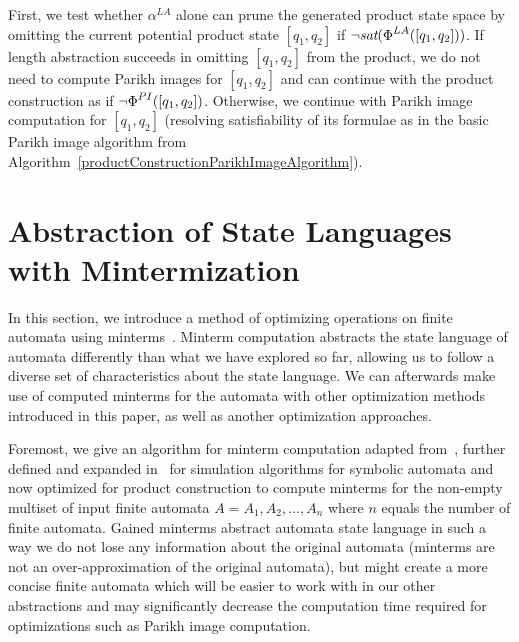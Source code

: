 First, we test whether $\alpha^{LA}$ alone can prune the generated product state space by omitting the current potential product state $[q_1, q_2]$ if $\neg \emph{sat}(\emph{$\Phi$}^{LA}([q_1, q_2]))$. If length abstraction succeeds in omitting $[q_1, q_2]$ from the product, we do not need to compute Parikh images for $[q_1, q_2]$ and can continue with the product construction as if $\neg \emph{$\Phi$}^{PI}([q_1, q_2])$. Otherwise, we continue with Parikh image computation for $[q_1, q_2]$ (resolving satisfiability of its formulae as in the basic Parikh image algorithm from Algorithm~\ref{productConstructionParikhImageAlgorithm}).


\section{Abstraction of State Languages with Mintermization}

In this section, we introduce a method of optimizing operations on finite automata using minterms~\cite{minterms-10.1007/978-3-642-18275-4_18}. Minterm computation abstracts the state language of automata differently than what we have explored so far, allowing us to follow a diverse set of characteristics about the state language. We can afterwards make use of computed minterms for the automata with other optimization methods introduced in this paper, as well as another optimization approaches.

Foremost, we give an algorithm for minterm computation adapted from~\cite{minterm_computation-Dantoni2014MinimizationOS}, further defined and expanded in~\cite{minterms_forms-FITPUB11801} for simulation algorithms for symbolic automata and now optimized for product construction to compute minterms for the non-empty multiset of input finite automata $A = {A_1, A_2, \dots, A_n}$ where $n$ equals the number of finite automata. Gained minterms abstract automata state language in such a way we do not lose any information about the original automata (minterms are not an over-approximation of the original automata), but might create a more concise finite automata which will be easier to work with in our other abstractions and may significantly decrease the computation time required for optimizations such as Parikh image computation.

